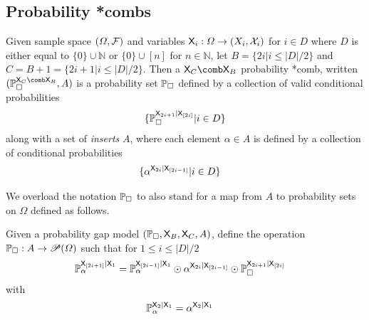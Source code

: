 \subsection{Probability *combs}


\begin{definition}\label{def:order1_bycond}
Given sample space $(\Omega,\mathcal{F})$ and variables $\mathsf{X}_{i}:\Omega\to (X_i,\mathcal{X}_i)$ for $i\in D$ where $D$ is either equal to $\{0\}\cup\mathbb{N}$ or $\{0\}\cup[n]$ for $n\in \mathbb{N}$, let $B=\{2i|i\leq |D|/2\}$ and $C=B+1=\{2i+1|i\leq |D|/2\}$. Then a $\RV{X}_C\comb\RV{X}_B$ probability *comb, written $(\prob{P}_\square^{\RV{X}_C\comb \RV{X}_B},A)$ is a probability set $\mathbb{P}_\square$ defined by a collection of valid conditional probabilities 
\begin{align}
	\{\mathbb{P}_\square^{\mathsf{X}_{2i+1}|\mathsf{X}_{[2i]}}|i\in D\}
\end{align}
along with a set of \emph{inserts} $A$, where each element $\alpha\in A$ is defined by a collection of conditional probabilities
\begin{align}
	&\{\alpha^{\mathsf{X}_{2i}|\mathsf{X}_{[2i-1]}}|i\in D\}
\end{align}
\end{definition}

We overload the notation $\mathbb{P}_\square$ to also stand for a map from $A$ to probability sets on $\Omega$ defined as follows.

\begin{definition}
Given a probability gap model $(\mathbb{P}_\square,\mathsf{X}_B,\mathsf{X}_C,A)$, define the operation $\mathbb{P}_\square:A\to \mathscr{P}(\Omega)$ such that for $1\leq i\leq |D|/2$ 
\begin{align}
	\mathbb{P}_\alpha^{\mathsf{X}_{[2i+1]}|\mathsf{X}_1} &= \mathbb{P}_\alpha^{\mathsf{X}_{[2i-1]}|\mathsf{X}_1}\odot \alpha^{\mathsf{X}_{2i}|\mathsf{X}_{[2i-1]}}\odot\mathbb{P}_{\square}^{\mathsf{X}_{2i+1}|\mathsf{X}_{[2i]}}
\end{align}
with
\begin{align}
	\mathbb{P}_\alpha^{\mathsf{X}_{2}|\mathsf{X}_1} &= \alpha^{\mathsf{X}_{2}|\mathsf{X}_{1}}
\end{align}
\end{definition}

